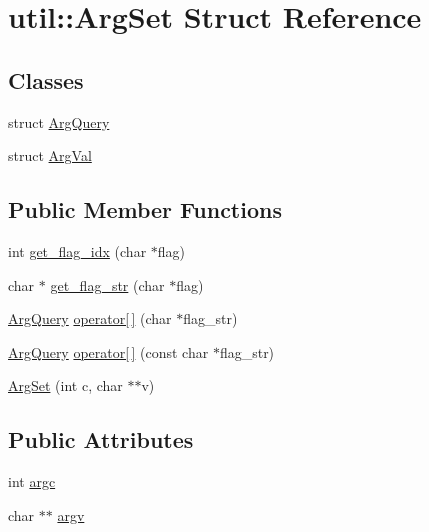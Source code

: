 \hypertarget{structutil_1_1ArgSet}{\section{util\-:\-:Arg\-Set Struct Reference}
\label{structutil_1_1ArgSet}
}
\subsection*{Classes}
\begin{DoxyCompactItemize}
\item 
struct \hyperlink{structutil_1_1ArgSet_1_1ArgQuery}{Arg\-Query}
\item 
struct \hyperlink{structutil_1_1ArgSet_1_1ArgVal}{Arg\-Val}
\end{DoxyCompactItemize}
\subsection*{Public Member Functions}
\begin{DoxyCompactItemize}
\item 
int \hyperlink{structutil_1_1ArgSet_a1ac48e526f8ad7ea3f5e82f4fedfbf4b}{get\-\_\-flag\-\_\-idx} (char $\ast$flag)
\item 
char $\ast$ \hyperlink{structutil_1_1ArgSet_a0a47d7ee7d98e3b86ece9273a914e271}{get\-\_\-flag\-\_\-str} (char $\ast$flag)
\item 
\hyperlink{structutil_1_1ArgSet_1_1ArgQuery}{Arg\-Query} \hyperlink{structutil_1_1ArgSet_abc97d70128d0134475f26cdbfcb66b96}{operator\mbox{[}$\,$\mbox{]}} (char $\ast$flag\-\_\-str)
\item 
\hyperlink{structutil_1_1ArgSet_1_1ArgQuery}{Arg\-Query} \hyperlink{structutil_1_1ArgSet_a57c4cc45553783636f894eec53aa5cd3}{operator\mbox{[}$\,$\mbox{]}} (const char $\ast$flag\-\_\-str)
\item 
\hyperlink{structutil_1_1ArgSet_a5c5e8f1332b19933a42fa22b37f0a376}{Arg\-Set} (int c, char $\ast$$\ast$v)
\end{DoxyCompactItemize}
\subsection*{Public Attributes}
\begin{DoxyCompactItemize}
\item 
int \hyperlink{structutil_1_1ArgSet_a57df8a954ced6672dbc61f6a50d31c57}{argc}
\item 
char $\ast$$\ast$ \hyperlink{structutil_1_1ArgSet_a6a79d9a39c5a40ebf20ce952d9d51487}{argv}
\end{DoxyCompactItemize}


